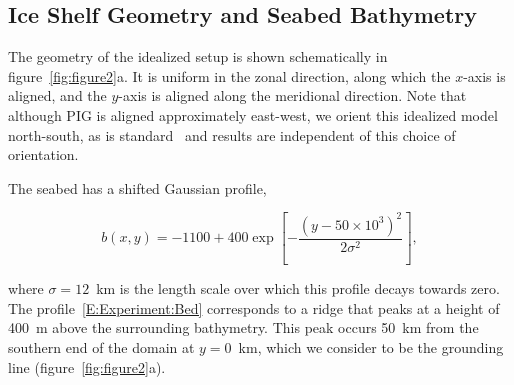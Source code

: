 \documentclass[draft]{agujournal2019}
\begin{document}
\subsection{Ice Shelf Geometry and Seabed Bathymetry}\label{S:Experiment:Geometry}
The geometry of the idealized setup is shown schematically in figure~\ref{fig:figure2}a. It is uniform in the zonal direction, along which the $x$-axis is aligned, and the $y$-axis is aligned along the meridional direction. Note that although PIG is aligned approximately east-west, we orient this idealized model north-south, as is standard~\cite{Grosfeld1997JGROceans, DeRydt2014JGeophysResOceans} and results are independent of this choice of orientation.

The seabed has a shifted Gaussian profile,
\begin{linenomath*}
\begin{equation}\label{E:Experiment:Bed}
    b(x,y) = -1100 + 400 \exp\left[-\frac{\left(y - 50\times 10^3\right)^2}{2\sigma^2}\right],
\end{equation}
\end{linenomath*}
where $\sigma = 12$~km is the length scale over which this profile decays towards zero. The profile~\eqref{E:Experiment:Bed} corresponds to a ridge that peaks at a height of 400~m above the surrounding bathymetry. This peak occurs 50 km from the southern end of the domain at $y=0$~km, which we consider to be the grounding line (figure~\ref{fig:figure2}a).
\end{document}
